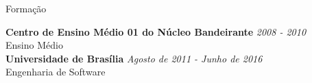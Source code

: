 \documentclass{resume} %
\begin{document}

\begin{rSection}{Formação}

{\bf Centro de Ensino Médio 01 do Núcleo Bandeirante} \hfill {\em 2008 - 2010} \\ 
Ensino Médio \\

{\bf Universidade de Brasília} \hfill {\em Agosto de 2011 - Junho de 2016} \\ 
Engenharia de Software \\

\end{rSection}

\end{document}
